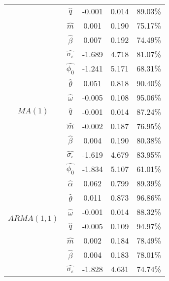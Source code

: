 \documentclass{bmcart}
\begin{document}
\begin{backmatter}
\begin{table}[h!]
\begin{tabular}{ccccc}
                              & $\hat{q}$                 &-0.001 & 0.014 & 89.03\% \\
                              & $\hat{m}$                 & 0.001 & 0.190 & 75.17\% \\
                              & $\hat{\beta}$             & 0.007 & 0.192 & 74.49\% \\
                              & $\hat{\sigma_{\epsilon}}$ &-1.689 & 4.718 & 81.07\% \\
\hline
\multirow{7}{*}{$MA(1)$}      & $\hat{\phi_0}$            &-1.241 & 5.171 & 68.31\% \\
                              & $\hat{\theta}$            & 0.051 & 0.818 & 90.40\% \\
                              & $\hat{\omega}$            &-0.005 & 0.108 & 95.06\% \\
                              & $\hat{q}$                 &-0.001 & 0.014 & 87.24\% \\
                              & $\hat{m}$                 &-0.002 & 0.187 & 76.95\% \\
                              & $\hat{\beta}$             & 0.004 & 0.190 & 80.38\% \\
                              & $\hat{\sigma_{\epsilon}}$ &-1.619 & 4.679 & 83.95\% \\
\hline
\multirow{8}{*}{$ARMA(1, 1)$} & $\hat{\phi_0}$            & -1.834 & 5.107 & 61.01\% \\
                              & $\hat{\alpha}$            & 0.062  & 0.799 & 89.39\% \\
                              & $\hat{\theta}$            & 0.011  & 0.873 & 96.86\% \\
                              & $\hat{\omega}$            & -0.001 & 0.014 & 88.32\% \\
                              & $\hat{q}$                 & -0.005 & 0.109 & 94.97\% \\
                              & $\hat{m}$                 & 0.002  & 0.184 & 78.49\% \\
                              & $\hat{\beta}$             & 0.004  & 0.183 & 78.01\% \\
                              & $\hat{\sigma_{\epsilon}}$ & -1.828 & 4.631 & 74.74\% \\
\hline
\end{tabular}
\end{table}


\end{backmatter}
\end{document}
